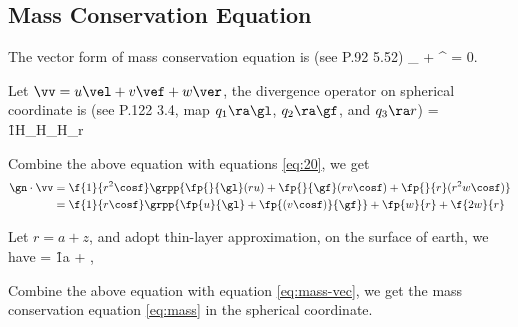 \subsection{Mass Conservation Equation} \label{der:mass}

The vector form of mass conservation equation is (see
\citet{Yang1982_book}{P.92 5.52})
\beeq \label{eq:mass-vec}
_ + 
\overbrace{ \rho \gn \cdot \vv }^ = 0.
\eneq

Let $\vv = u\vel + v\vef + w\ver$, 
the divergence operator on spherical coordinate is 
(see \citet{Xie2012_book}{P.122 3.4}, 
map $q_1\ra \gl$, $q_2\ra \gf$, and $q_3\ra r$)
\beeq
\gn \cdot \vv = \f{1}{H_\gl H_\gf H_r} 
\eneq

Combine the above equation with equations \ref{eq:20}, we get
\begin{align}
  \gn \cdot \vv &= \f{1}{r^2\cosf} 
\grpp{ \fp{}{\gl}(ru) + \fp{}{\gf}(rv\cosf) + \fp{}{r}(r^2 w\cosf) }\\
&= \f{1}{r\cosf} \grpp{ \fp{u}{\gl} + \fp{(v\cosf)}{\gf} } + 
\fp{w}{r} + \f{2 w}{r}
\end{align}

Let $r=a+z$, and adopt thin-layer approximation, on the surface of earth, we have
\beeq
\divv = \f{1}{a\cosf}  + ,
\eneq

Combine the above equation with equation \ref{eq:mass-vec}, we get the mass
conservation equation \ref{eq:mass} in the spherical coordinate.
